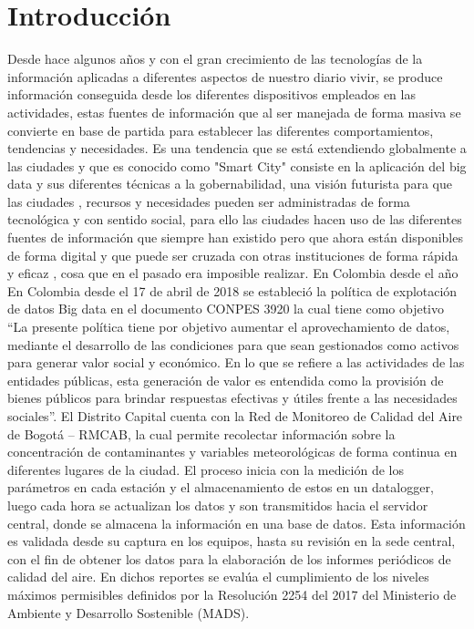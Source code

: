 \documentclass[a4paper, fontsize=16pt, oneside]{book}
\begin{document}
\tableofcontents



\newpage
\justify
\section{Introducción}

Desde hace algunos años y con el gran crecimiento de las tecnologías de la información aplicadas a diferentes aspectos de nuestro diario vivir, se produce información conseguida desde los diferentes dispositivos empleados en las actividades, estas fuentes de información que al ser manejada de forma masiva se convierte en base de partida para establecer las diferentes comportamientos, tendencias y necesidades.
Es una tendencia que se está extendiendo globalmente a las ciudades y que es conocido como "Smart City" consiste en la aplicación del big data y sus diferentes técnicas a la gobernabilidad, una visión futurista para que las ciudades , recursos y necesidades pueden ser administradas de forma tecnológica y con sentido social, para ello las ciudades hacen uso de las diferentes fuentes de información que siempre han existido pero que ahora están disponibles de forma digital y que puede ser cruzada con otras instituciones de forma rápida y eficaz , cosa que en el pasado era imposible realizar.
En Colombia desde el año En Colombia desde el 17 de abril de 2018 se estableció la política de explotación de datos Big data en el documento CONPES 3920 la cual tiene como objetivo “La presente política tiene por objetivo aumentar el aprovechamiento de datos, mediante el desarrollo de las condiciones para que sean gestionados como activos para generar valor social y económico. En lo que se refiere a las actividades de las entidades públicas, esta generación de valor es entendida como la provisión de bienes públicos para brindar respuestas efectivas y útiles frente a las necesidades sociales”.
El Distrito Capital cuenta con la Red de Monitoreo de Calidad del Aire de Bogotá – RMCAB, la cual permite recolectar información sobre la concentración de contaminantes y variables meteorológicas de forma continua en diferentes lugares de la ciudad. 
El proceso inicia con la medición de los parámetros en cada estación y el almacenamiento de estos en un datalogger, luego cada hora se actualizan los datos y son transmitidos hacia el servidor central, donde se almacena la información en una base de datos. 
Esta información es validada desde su captura en los equipos, hasta su revisión en la sede central, con el fin de obtener los datos para la elaboración de los informes periódicos de calidad del aire. En dichos reportes se evalúa el cumplimiento de los niveles máximos permisibles definidos por la Resolución 2254 del 2017 del Ministerio de Ambiente y Desarrollo Sostenible (MADS).
\end{document}
